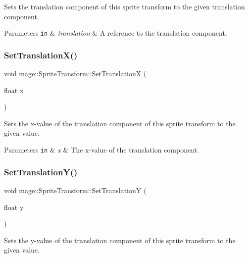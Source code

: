 Sets the translation component of this sprite transform to the given translation component.


\begin{DoxyParams}[1]{Parameters}
\mbox{\tt in}  & {\em translation} & A reference to the translation component. \\
\hline
\end{DoxyParams}
\hypertarget{structmage_1_1_sprite_transform_a59f5300f046b73c958084977158ed789}{}\label{structmage_1_1_sprite_transform_a59f5300f046b73c958084977158ed789} 
\subsubsection{\texorpdfstring{Set\+Translation\+X()}{SetTranslationX()}}
{\footnotesize\ttfamily void mage\+::\+Sprite\+Transform\+::\+Set\+TranslationX (\begin{DoxyParamCaption}\item[{float}]{x }\end{DoxyParamCaption})}

Sets the x-\/value of the translation component of this sprite transform to the given value.


\begin{DoxyParams}[1]{Parameters}
\mbox{\tt in}  & {\em x} & The x-\/value of the translation component. \\
\hline
\end{DoxyParams}
\hypertarget{structmage_1_1_sprite_transform_a52a07a3c3d9f65a33bc658208cd40444}{}\label{structmage_1_1_sprite_transform_a52a07a3c3d9f65a33bc658208cd40444} 
\subsubsection{\texorpdfstring{Set\+Translation\+Y()}{SetTranslationY()}}
{\footnotesize\ttfamily void mage\+::\+Sprite\+Transform\+::\+Set\+TranslationY (\begin{DoxyParamCaption}\item[{float}]{y }\end{DoxyParamCaption})}

Sets the y-\/value of the translation component of this sprite transform to the given value.


